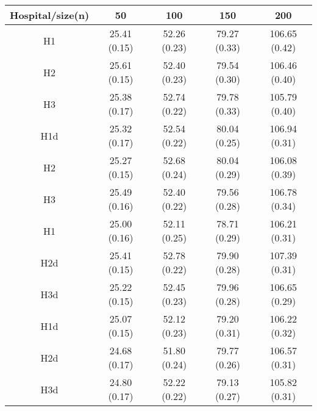 \begin{center}
\begin{tabular}{c | c | c | c | c}
Hospital/size(n) & 50 & 100 & 150 & 200\\ \hline
H1 & 25.41 (0.15) & 52.26 (0.23) & 79.27 (0.33) & 106.65 (0.42) \\
H2 & 25.61 (0.15) & 52.40 (0.23) & 79.54 (0.30) & 106.46 (0.40) \\
H3 & 25.38 (0.17) & 52.74 (0.22) & 79.78 (0.33) & 105.79 (0.40) \\
H1d & 25.32 (0.17) & 52.54 (0.22) & 80.04 (0.25) & 106.94 (0.31) \\
H2 & 25.27 (0.15) & 52.68 (0.24) & 80.04 (0.29) & 106.08 (0.39) \\
H3 & 25.49 (0.16) & 52.40 (0.22) & 79.56 (0.28) & 106.78 (0.34) \\
H1 & 25.00 (0.16) & 52.11 (0.25) & 78.71 (0.29) & 106.21 (0.31) \\
H2d & 25.41 (0.15) & 52.78 (0.22) & 79.90 (0.28) & 107.39 (0.31) \\
H3d & 25.22 (0.15) & 52.45 (0.23) & 79.96 (0.28) & 106.65 (0.29) \\
H1d & 25.07 (0.15) & 52.12 (0.23) & 79.20 (0.31) & 106.22 (0.32) \\
H2d & 24.68 (0.17) & 51.80 (0.24) & 79.77 (0.26) & 106.57 (0.31) \\
H3d & 24.80 (0.17) & 52.22 (0.22) & 79.13 (0.27) & 105.82 (0.31) \\
\end{tabular}
\end{center}
